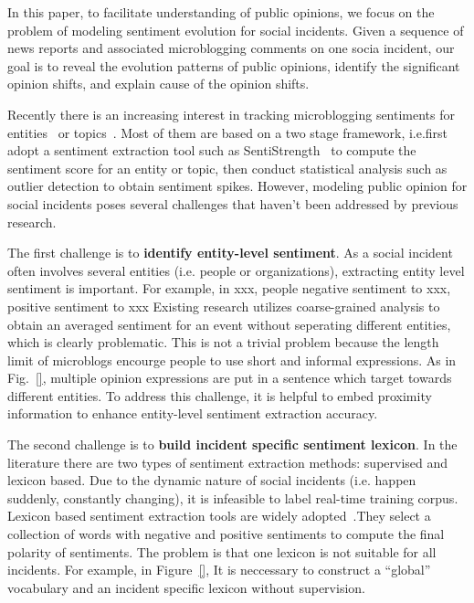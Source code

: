 \documentclass[runningheads]{llncs}
\begin{document}
In this paper, to facilitate understanding of public opinions, we focus on the problem of modeling sentiment evolution for social incidents. 
Given a sequence of news reports and associated microblogging comments on one socia incident, our goal is to reveal the evolution patterns of public opinions, identify the significant opinion shifts, and explain cause of the opinion shifts.

Recently there is an increasing interest in tracking microblogging sentiments for entities~\cite{Giachanou2016sentichange,Giachanou2017sentichange} or topics~\cite{Tsytsarau2014Topics,Thelwall2011topic}. Most of them are based on a two stage framework, i.e.first adopt a sentiment extraction tool such as SentiStrength~\cite{} to compute the sentiment score for an entity or topic, then conduct statistical analysis such as outlier detection to obtain sentiment spikes. 
However, modeling public opinion for social incidents poses several challenges that haven't been addressed by previous research.

The first challenge is to \textbf{identify entity-level sentiment}. 
As a social incident often involves several entities (i.e. people or organizations), extracting entity level sentiment is important.
For example, in xxx, people negative sentiment to xxx, positive sentiment to xxx %
Existing research utilizes coarse-grained analysis to obtain an averaged sentiment for an event without seperating different entities, which is clearly problematic.
This is not a trivial problem because the length limit of microblogs encourge people to use short and informal expressions.
As in Fig.~\ref{}, multiple opinion expressions are put in a sentence which target towards different entities. %
To address this challenge, it is helpful to embed proximity information to enhance entity-level sentiment extraction accuracy. 

The second challenge is to \textbf{build incident specific sentiment lexicon}. 
In the literature there are two types of sentiment extraction methods: supervised and lexicon based.
Due to the dynamic nature of social incidents (i.e. happen suddenly, constantly changing), it is infeasible to label real-time training corpus. 
Lexicon based sentiment extraction tools are widely adopted~\cite{}.They select a collection of words with negative and positive sentiments to compute the final polarity of sentiments. %
The problem is that one lexicon is not suitable for all incidents. 
For example, in Figure~\ref{},  %
It is neccessary to construct a ``global'' vocabulary and an incident specific lexicon without supervision.
\end{document}
